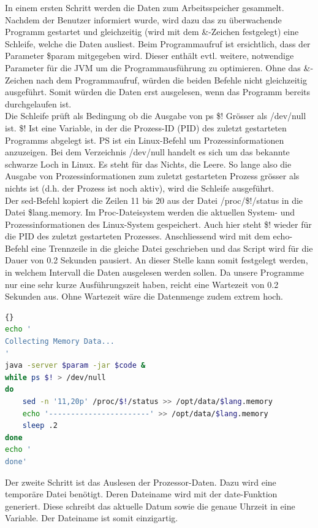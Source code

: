 \documentclass{fancydocument}
\begin{document}
In einem ersten Schritt werden die Daten zum Arbeitsspeicher gesammelt. Nachdem der Benutzer informiert wurde, wird dazu das zu überwachende Programm gestartet und gleichzeitig (wird mit dem \&-Zeichen festgelegt) eine Schleife, welche die Daten ausliest. Beim Programmaufruf ist ersichtlich, dass der Parameter \$param mitgegeben wird. Dieser enthält evtl. weitere, notwendige Parameter für die JVM um die Programmausführung zu optimieren. Ohne das \&-Zeichen nach dem Programmaufruf, würden die beiden Befehle nicht gleichzeitig ausgeführt. Somit würden die Daten erst ausgelesen, wenn das Programm bereits durchgelaufen ist. 
\\
Die Schleife prüft als Bedingung ob die Ausgabe von ps \$! Grösser als /dev/null ist. \$! Ist eine Variable, in der die Prozess-ID (PID) des zuletzt gestarteten Programms abgelegt ist. PS ist ein Linux-Befehl um Prozessinformationen anzuzeigen. Bei dem Verzeichnis /dev/null handelt es sich um das bekannte schwarze Loch in Linux. Es steht für das Nichts, die Leere. So lange also die Ausgabe von Prozessinformationen zum zuletzt gestarteten Prozess grösser als nichts ist (d.h. der Prozess ist noch aktiv), wird die Schleife ausgeführt.
\\
Der sed-Befehl kopiert die Zeilen 11 bis 20 aus der Datei /proc/\$!/status in die Datei \$lang.memory. Im Proc-Dateisystem werden die aktuellen System- und Prozessinformationen des Linux-System gespeichert. Auch hier steht \$! wieder für die PID des zuletzt gestarteten Prozesses. Anschliessend wird mit dem echo-Befehl eine Trennzeile in die gleiche Datei geschrieben und das Script wird für die Dauer von 0.2 Sekunden pausiert. An dieser Stelle kann somit festgelegt werden, in welchem Intervall die Daten ausgelesen werden sollen. Da unsere Programme nur eine sehr kurze Ausführungszeit haben, reicht eine Wartezeit von 0.2 Sekunden aus. Ohne Wartezeit wäre die Datenmenge zudem extrem hoch.

\noindent
\begin{minipage}{\textwidth}
\begin{lstlisting}[language=bash,caption=Speicherdaten sammeln]{}
echo '
Collecting Memory Data...
'
java -server $param -jar $code &
while ps $! > /dev/null
do
	sed -n '11,20p' /proc/$!/status >> /opt/data/$lang.memory
	echo '-----------------------' >> /opt/data/$lang.memory		
	sleep .2
done
echo '
done'
\end{lstlisting}
\end{minipage}

Der zweite Schritt ist das Auslesen der Prozessor-Daten. Dazu wird eine temporäre Datei benötigt. Deren Dateiname wird mit der date-Funktion generiert. Diese schreibt das aktuelle Datum sowie die genaue Uhrzeit in eine Variable. Der Dateiname ist somit einzigartig.
\end{document}
